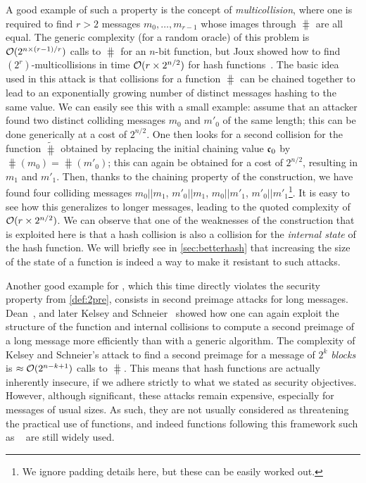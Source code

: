 A good example of such a property is the concept of \emph{multicollision}, where one is required to find $r > 2$ messages $m_{0},\ldots,m_{r-1}$ whose images through $\hash$
are all equal. The generic complexity (\eg for a random oracle) of this problem is $\operatorname{\mathcal{O}}(2^{n\times (r-1)/r})$ calls to $\hash$ for an $n$-bit function, but Joux showed how to
find $(2^r)$-multicollisions in time $\operatorname{\mathcal{O}}(r\times 2^{n/2})$ for \merkdam hash functions~\cite{DBLP:conf/crypto/Joux04}.
The basic idea used in this attack is that collisions for a \merkdam function $\hash$ can be chained together to lead to an exponentially growing number of distinct messages hashing
to the same value. We can easily see this with a small example: assume that an attacker found two distinct colliding messages $m_0$ and $m'_0$ of the same length;
this can be done generically at a cost of $2^{n/2}$. One then looks for a second collision for the function $\widetilde \hash$ obtained by replacing the initial chaining
value $\mathfrak{c}_0$ by $\hash(m_0) = \hash(m'_0)$; this can again be obtained for a cost of $2^{n/2}$, resulting in $m_1$ and $m'_1$. Then, thanks to
the chaining property of the \merkdam construction, we have found four colliding messages $m_0||m_1$, $m'_0||m_1$, $m_0||m'_1$, $m'_0||m'_1$\footnote{We ignore
padding details here, but these can be easily worked out.}. It is easy to see how this generalizes to longer messages, leading to the quoted complexity of $\operatorname{\mathcal{O}}(r \times 2^{n/2})$.
We can observe that one of the weaknesses of the construction that is exploited here is that a hash collision is also
a collision for the \emph{internal state} of the hash function. We will briefly see in \autoref{sec:betterhash} that increasing the size of the state of a function is indeed a way to make it resistant
to such attacks.

Another good example for \merkdam, which this time directly violates the security property from \autoref{def:2pre}, consists in second preimage attacks for long messages.
Dean~\cite{dean}, and later Kelsey and Schneier~\cite{DBLP:conf/eurocrypt/KelseyS05} showed how one can again exploit the structure of the function and internal collisions to compute a second preimage
of a long message more efficiently than with a generic algorithm. The complexity of Kelsey and Schneier's attack to find a second preimage for a message
of $2^k$ \emph{blocks} is $\approx \operatorname{\mathcal{O}}(2^{n-k+1})$ calls to $\hash$. This means that \merkdam hash functions are actually inherently insecure, if we adhere
strictly to what we stated as security objectives. However, although significant, these attacks remain expensive, especially for messages of usual sizes. As such, they are not usually considered as threatening
the practical use of \merkdam functions, and indeed functions following this framework such as \shatwo~\cite{Nist-SHA} are still widely used.

